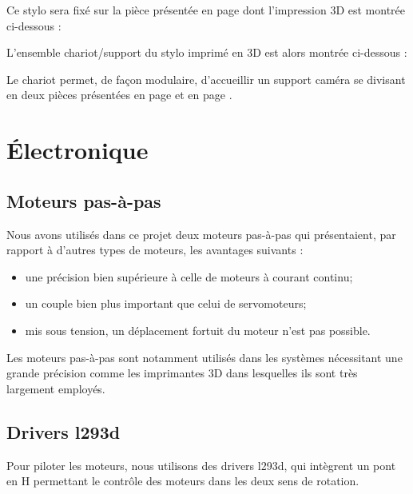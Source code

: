 \documentclass[12pt,a4paper]{report}
\begin{document}
	Ce stylo sera fixé sur la pièce présentée en page\pageref{supportstylo} dont l'impression 3D est montrée ci-dessous :
	
	
L'ensemble chariot/support du stylo imprimé en 3D est alors montrée ci-dessous :


Le chariot permet, de façon modulaire, d'accueillir un support caméra se divisant en deux pièces présentées en page \pageref{chariotcamera} et en page \pageref{supportcamera}.
	

	\chapter{Électronique}
\section{Moteurs pas-à-pas}
\label{Elec_stepper}
Nous avons utilisés dans ce projet deux moteurs pas-à-pas qui présentaient, par rapport à d'autres types de moteurs, les avantages suivants : 
\begin{itemize}[label=--]
\item une précision bien supérieure à celle de moteurs à courant continu;
\item un couple bien plus important que celui de servomoteurs;
\item mis sous tension, un déplacement fortuit du moteur n'est pas possible.
\end{itemize}
Les moteurs pas-à-pas sont notamment utilisés dans les systèmes nécessitant une grande précision comme les imprimantes 3D dans lesquelles ils sont très largement employés.

\section{Drivers l293d}
Pour piloter les moteurs, nous utilisons des drivers l293d, qui intègrent un pont en H permettant le contrôle des moteurs dans les deux sens de rotation.
\end{document}
